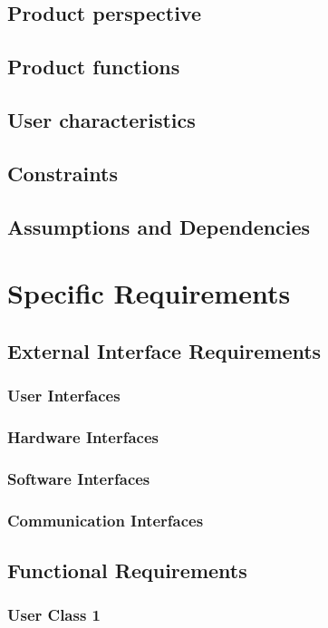 \documentclass[a4paper,12pt]{book}
\begin{document}
\section{Product perspective}
\section{Product functions}
\section{User characteristics}
\section{Constraints}
\section{Assumptions and Dependencies}

\chapter{Specific Requirements} \label{SpecificRequirements}
\section{External Interface Requirements}
\subsection{User Interfaces}
\subsection{Hardware Interfaces}
\subsection{Software  Interfaces}
\subsection{Communication Interfaces}

\newpage
\section{Functional Requirements}
\subsection{User Class 1}
\end{document}

